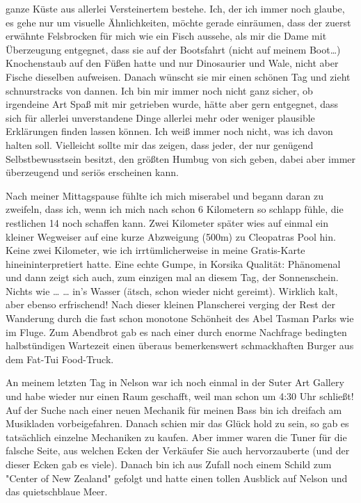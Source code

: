 ganze Küste aus allerlei Versteinertem bestehe. Ich, der ich immer noch
glaube, es gehe nur um visuelle Ähnlichkeiten, möchte gerade einräumen,
dass der zuerst erwähnte Felsbrocken für mich wie ein Fisch aussehe, als
mir die Dame mit Überzeugung entgegnet, dass sie auf der Bootsfahrt
(nicht auf meinem Boot\ldots) Knochenstaub auf den Füßen hatte und nur
Dinosaurier und Wale, nicht aber Fische dieselben aufweisen. Danach
wünscht sie mir einen schönen Tag und zieht schnurstracks von dannen.
Ich bin mir immer noch nicht ganz sicher, ob irgendeine Art Spaß mit mir
getrieben wurde, hätte aber gern entgegnet, dass sich für allerlei
unverstandene Dinge allerlei mehr oder weniger plausible Erklärungen
finden lassen können. Ich weiß immer noch nicht, was ich davon halten
soll. Vielleicht sollte mir das zeigen, dass jeder, der nur genügend
Selbstbewusstsein besitzt, den größten Humbug von sich geben, dabei aber
immer überzeugend und seriös erscheinen kann.

Nach meiner Mittagspause fühlte ich mich miserabel und begann daran zu
zweifeln, dass ich, wenn ich mich nach schon 6 Kilometern so schlapp
fühle, die restlichen 14 noch schaffen kann. Zwei Kilometer später wies
auf einmal ein kleiner Wegweiser auf eine kurze Abzweigung (500m) zu
Cleopatras Pool hin. Keine zwei Kilometer, wie ich irrtümlicherweise in
meine Gratis-Karte hineininterpretiert hatte. Eine echte Gumpe, in
Korsika Qualität: Phänomenal und dann zeigt sich auch, zum einzigen mal
an diesem Tag, der Sonnenschein. Nichts wie \ldots{} \ldots{} in's
Wasser (ätsch, schon wieder nicht gereimt). Wirklich kalt, aber ebenso
erfrischend! Nach dieser kleinen Planscherei verging der Rest der
Wanderung durch die fast schon monotone Schönheit des Abel Tasman Parks
wie im Fluge. Zum Abendbrot gab es nach einer durch enorme Nachfrage
bedingten halbstündigen Wartezeit einen überaus bemerkenswert
schmackhaften Burger aus dem Fat-Tui Food-Truck.

An meinem letzten Tag in Nelson war ich noch einmal in der Suter Art
Gallery und habe wieder nur einen Raum geschafft, weil man schon um 4:30
Uhr schließt! Auf der Suche nach einer neuen Mechanik für meinen Bass
bin ich dreifach am Musikladen vorbeigefahren. Danach schien mir das
Glück hold zu sein, so gab es tatsächlich einzelne Mechaniken zu kaufen.
Aber immer waren die Tuner für die falsche Seite, aus welchen Ecken der
Verkäufer Sie auch hervorzauberte (und der dieser Ecken gab es viele).
Danach bin ich aus Zufall noch einem Schild zum "Center of New Zealand"
gefolgt und hatte einen tollen Ausblick auf Nelson und das quietschblaue
Meer.

